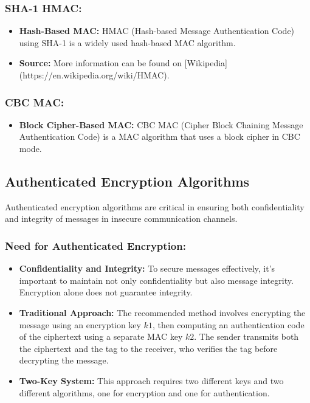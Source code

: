 \documentclass[12pt]{article}
\begin{document}
\subsubsection*{SHA-1 HMAC:}
\begin{itemize}
    \item \textbf{Hash-Based MAC:} HMAC (Hash-based Message Authentication Code) using SHA-1 is a widely used hash-based MAC algorithm.
    \item \textbf{Source:} More information can be found on [Wikipedia](https://en.wikipedia.org/wiki/HMAC).
\end{itemize}

\subsubsection*{CBC MAC:}
\begin{itemize}
    \item \textbf{Block Cipher-Based MAC:} CBC MAC (Cipher Block Chaining Message Authentication Code) is a MAC algorithm that uses a block cipher in CBC mode.
\end{itemize}

\subsection*{Authenticated Encryption Algorithms}

Authenticated encryption algorithms are critical in ensuring both confidentiality and integrity of messages in insecure communication channels.

\subsubsection*{Need for Authenticated Encryption:}
\begin{itemize}
    \item \textbf{Confidentiality and Integrity:} To secure messages effectively, it's important to maintain not only confidentiality but also message integrity. Encryption alone does not guarantee integrity.
    \item \textbf{Traditional Approach:} The recommended method involves encrypting the message using an encryption key \( k1 \), then computing an authentication code of the ciphertext using a separate MAC key \( k2 \). The sender transmits both the ciphertext and the tag to the receiver, who verifies the tag before decrypting the message.
    \item \textbf{Two-Key System:} This approach requires two different keys and two different algorithms, one for encryption and one for authentication.
\end{itemize}
\end{document}
